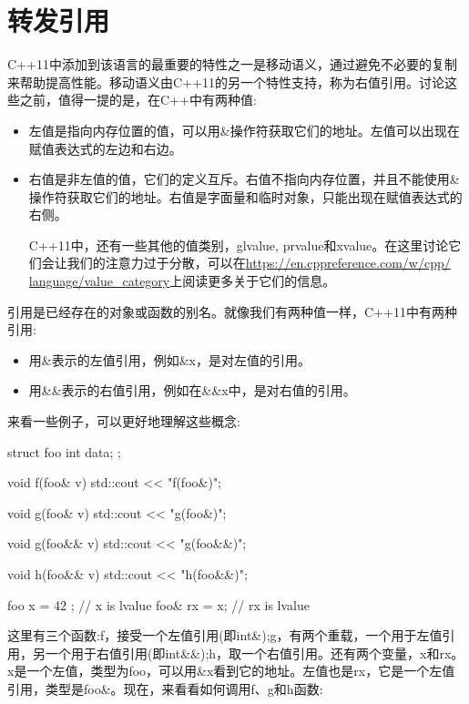 \section{转发引用}
C++11中添加到该语言的最重要的特性之一是移动语义，通过避免不必要的复制来帮助提高性能。移动语义由C++11的另一个特性支持，称为右值引用。讨论这些之前，值得一提的是，在C++中有两种值:

\begin{itemize}
\item
左值是指向内存位置的值，可以用\&操作符获取它们的地址。左值可以出现在赋值表达式的左边和右边。

\item
右值是非左值的值，它们的定义互斥。右值不指向内存位置，并且不能使用\&操作符获取它们的地址。右值是字面量和临时对象，只能出现在赋值表达式的右侧。

\begin{note}
C++11中，还有一些其他的值类别，glvalue, prvalue和xvalue。在这里讨论它们会让我们的注意力过于分散，可以在\url{https://en.cppreference.com/w/cpp/ language/value_category}上阅读更多关于它们的信息。
\end{note}

\end{itemize}

引用是已经存在的对象或函数的别名。就像我们有两种值一样，C++11中有两种引用:

\begin{itemize}
\item
用\&表示的左值引用，例如\&x，是对左值的引用。

\item
用\&\&表示的右值引用，例如在\&\&x中，是对右值的引用。
\end{itemize}

来看一些例子，可以更好地理解这些概念:

\begin{cpp}
struct foo
{
	int data;
};

void f(foo& v)
{ std::cout << "f(foo&)\n"; }

void g(foo& v)
{ std::cout << "g(foo&)\n"; }

void g(foo&& v)
{ std::cout << "g(foo&&)\n"; }

void h(foo&& v)
{ std::cout << "h(foo&&)\n"; }

foo x = { 42 }; // x is lvalue
foo& rx = x; // rx is lvalue
\end{cpp}

这里有三个函数:f，接受一个左值引用(即int\&);g，有两个重载，一个用于左值引用，另一个用于右值引用(即int\&\&);h，取一个右值引用。还有两个变量，x和rx。x是一个左值，类型为foo，可以用\&x看到它的地址。左值也是rx，它是一个左值引用，类型是foo\&。现在，来看看如何调用f、g和h函数:

